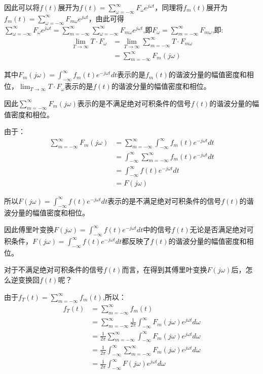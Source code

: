 \documentclass{article}
\numberwithin{equation}{section}
\numberwithin{figure}{section}
\begin{document}
因此可以将$f(t)$展开为$f(t)=\sum_{\omega=-\infty}^{\infty}F_\omega e^{j\omega t}$，同理将$f_m(t)$展开为$f_m(t)=\sum_{\omega=-\infty}^{\infty}F_{m\omega}e^{j\omega t}$，由此可得$\sum_{\omega=-\infty}^{\infty}F_\omega e^{j\omega t}=\sum_{m=-\infty}^{\infty}\sum_{\omega=-\infty}^{\infty}F_{m\omega}e^{j\omega t}$,即$F_\omega=\sum_{m=-\infty}^{\infty}F_{m\omega}$,即:
\begin{equation}
    \begin{split}
        \lim_{T\rightarrow \infty}T·F_\omega&=\lim_{T\rightarrow \infty}\sum_{m=-\infty}^{\infty}T·F_{m\omega}\\
        &=\sum_{m=-\infty}^{\infty}F_m(j\omega)
    \end{split}
\end{equation}

其中$F_m(j\omega)=\int_{-\infty}^{\infty}f_m(t)e^{-j\omega t}dt$表示的是$f_m(t)$的谐波分量的幅值密度和相位，$\lim_{T\rightarrow \infty}T·F_\omega$表示的是$f(t)$的谐波分量的幅值密度和相位。

因此$\sum_{m=-\infty}^{\infty}F_m(j\omega)$表示的是不满足绝对可积条件的信号$f(t)$的谐波分量的幅值密度和相位。

由于：
\begin{equation}
    \begin{split}
        \sum_{m=-\infty}^{\infty}F_m(j\omega)&=\sum_{m=-\infty}^{\infty}\int_{-\infty}^{\infty}f_m(t)e^{-j\omega t}dt\\
        &=\int_{-\infty}^{\infty}\sum_{m=-\infty}^{\infty}f_m(t)e^{-j\omega t}dt\\
        &=\int_{-\infty}^{\infty}f(t)e^{-j\omega t}dt\\
        &=F(j\omega)
    \end{split}
\end{equation}

所以$F(j\omega)=\int_{-\infty}^{\infty}f(t)e^{-j\omega t}dt$表示的是不满足绝对可积条件的信号$f(t)$的谐波分量的幅值密度和相位。

因此傅里叶变换$F(j\omega)=\int_{-\infty}^{\infty}f(t)e^{-j\omega t}dt$中的信号$f(t)$无论是否满足绝对可积条件，$F(j\omega)=\int_{-\infty}^{\infty}f(t)e^{-j\omega t}dt$都反映了$f(t)$的谐波分量的幅值密度和相位。

对于不满足绝对可积条件的信号$f(t)$而言，在得到其傅里叶变换$F(j\omega)$后，怎么逆变换回$f(t)$呢？

由于$f_T(t)=\sum_{m=-\infty}^{\infty}f_m(t)$,所以：
\begin{equation}
    \begin{split}
        f_T(t)&=\sum_{m=-\infty}^{\infty}f_m(t)\\
        &=\sum_{m=-\infty}^{\infty}\frac{1}{2\pi}\int_{-\infty}^{\infty}F_m(j\omega)e^{j\omega t}d\omega\\
        &=\frac{1}{2\pi}\sum_{m=-\infty}^{\infty}\int_{-\infty}^{\infty}F_m(j\omega)e^{j\omega t}d\omega\\
        &=\frac{1}{2\pi}\int_{-\infty}^{\infty}\sum_{m=-\infty}^{\infty}F_m(j\omega)e^{j\omega t}d\omega\\
        &=\frac{1}{2\pi}\int_{-\infty}^{\infty}F(j\omega)e^{j\omega t}d\omega
    \end{split}
\end{equation}
\end{document}
